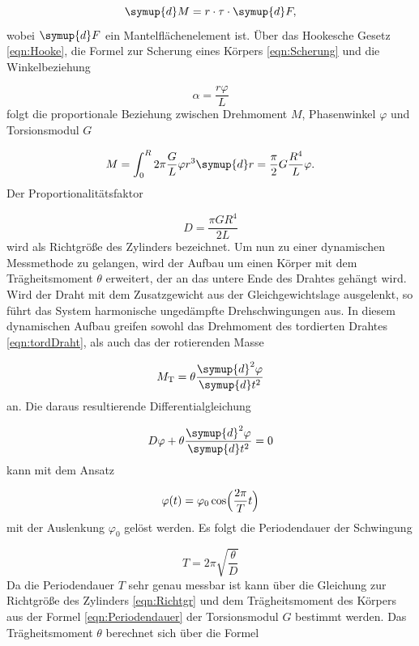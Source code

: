 \begin{equation}
  \symup{d}M = r \cdot \tau \cdot \symup{d} F,
\end{equation}
wobei $\symup{d}F$ ein Mantelflächenelement ist.
Über das Hookesche Gesetz \eqref{eqn:Hooke}, die Formel zur Scherung eines
Körpers \eqref{eqn:Scherung} und die Winkelbeziehung

\begin{equation}
  \alpha = \frac{r\varphi}{L}
\end{equation}
folgt die proportionale Beziehung zwischen Drehmoment $M$, Phasenwinkel
$\varphi$ und Torsionsmodul $G$

\begin{equation}
  M = \int_{0}^{R} 2\pi \frac{G}{L} \varphi r^3 \symup{d}r = \frac{\pi}{2} G
  \frac{R^4}{L} \varphi.
  \label{eqn:tordDraht}
\end{equation}
Der Proportionalitätsfaktor

\begin{equation}
  D = \frac{\pi G R^4}{2L}
  \label{eqn:Richtgr}
\end{equation}
wird als Richtgröße des Zylinders bezeichnet.
Um nun zu einer dynamischen Messmethode zu gelangen, wird der Aufbau
um einen Körper mit dem Trägheitsmoment $\theta$ erweitert, der an das untere
Ende des Drahtes gehängt wird.
Wird der Draht mit dem Zusatzgewicht aus der Gleichgewichtslage ausgelenkt, so
führt das System harmonische ungedämpfte Drehschwingungen aus. In diesem
dynamischen Aufbau greifen sowohl das Drehmoment des tordierten Drahtes
\eqref{eqn:tordDraht}, als auch das der rotierenden Masse

\begin{equation}
  M_\text{T} = \theta \frac{\symup{d}^2\varphi}{\symup{d}t^2}
\end{equation}
an.
Die daraus resultierende Differentialgleichung

\begin{equation}
  D \varphi + \theta \frac{\symup{d}^2\varphi}{\symup{d}t^2} = 0
  \label{eqn:DrehmomentDGL}
\end{equation}
kann mit dem Ansatz

\begin{equation}
  \varphi(t) = \varphi_0 \cos \Bigl(\frac{2\pi}{T}t\Bigr)
\end{equation}
mit der Auslenkung $\varphi_0$ gelöst werden.
Es folgt die Periodendauer der Schwingung

\begin{equation}
  T = 2\pi \sqrt{\frac{\theta}{D}}
  \label{eqn:Periodendauer}
\end{equation}
Da die Periodendauer $T$ sehr genau messbar ist kann über die
Gleichung zur Richtgröße des Zylinders \eqref{eqn:Richtgr} und dem
Trägheitsmoment des Körpers aus der Formel \eqref{eqn:Periodendauer} der
Torsionsmodul $G$ bestimmt werden.
Das Trägheitsmoment $\theta$ berechnet sich über die Formel

